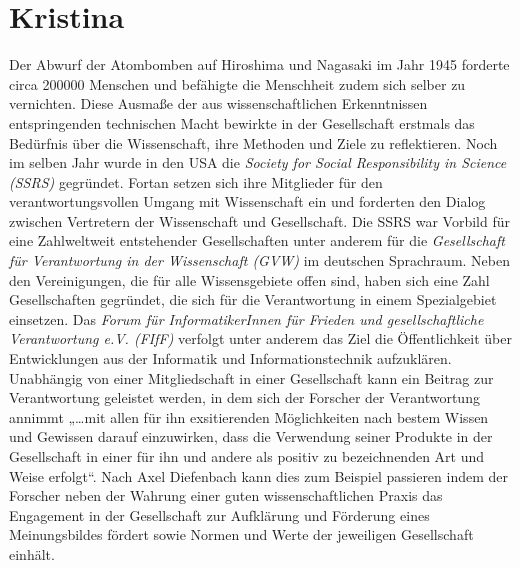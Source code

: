 \documentclass{pmwk}
\begin{document}
\section*{Kristina}
Der Abwurf der Atombomben auf Hiroshima und Nagasaki im Jahr 1945 forderte circa 200000 Menschen und befähigte die Menschheit zudem sich selber zu vernichten. Diese Ausmaße der aus wissenschaftlichen Erkenntnissen entspringenden technischen Macht bewirkte in der Gesellschaft erstmals das Bedürfnis über die Wissenschaft, ihre Methoden und Ziele zu reflektieren. Noch im selben Jahr wurde in den USA die \textit{Society for Social Responsibility in Science (SSRS)} gegründet. Fortan setzen sich ihre Mitglieder für den verantwortungsvollen Umgang mit Wissenschaft ein und forderten den Dialog zwischen Vertretern der Wissenschaft und Gesellschaft. Die SSRS war Vorbild für eine Zahlweltweit entstehender Gesellschaften unter anderem für die \textit{Gesellschaft für Verantwortung in der Wissenschaft (GVW)} im deutschen Sprachraum. Neben den Vereinigungen, die für alle Wissensgebiete offen sind, haben sich eine Zahl Gesellschaften gegründet, die sich für die Verantwortung in einem Spezialgebiet einsetzen. Das \textit{Forum für InformatikerInnen für Frieden und gesellschaftliche Verantwortung e.V. (FIfF)} verfolgt unter anderem das Ziel die Öffentlichkeit über Entwicklungen aus der Informatik und Informationstechnik aufzuklären.
Unabhängig von einer Mitgliedschaft in einer Gesellschaft kann ein Beitrag zur Verantwortung geleistet werden, in dem sich der Forscher der Verantwortung annimmt „…mit allen für ihn exsitierenden Möglichkeiten nach bestem Wissen und Gewissen darauf einzuwirken, dass die Verwendung seiner Produkte in der Gesellschaft in einer für ihn und andere als positiv zu bezeichnenden Art und Weise erfolgt“. Nach Axel Diefenbach kann dies zum Beispiel passieren indem der Forscher neben der Wahrung einer guten wissenschaftlichen Praxis das Engagement in der Gesellschaft zur Aufklärung und Förderung eines Meinungsbildes fördert sowie Normen und Werte der jeweiligen Gesellschaft einhält.



\end{document}
